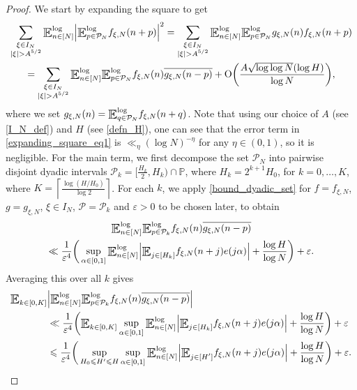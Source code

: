 \documentclass[letter,11pt]{article}
\theoremstyle{plain} %
\theoremstyle{definition} %
\theoremstyle{plain}
\theoremstyle{plain}
\theoremstyle{plain}
\numberwithin{equation}{section}
\newcommand{\Oh}{{\mathrm O}}
\renewcommand{\epsilon}{\varepsilon}
\renewcommand{\leq}{\leqslant}
\renewcommand{\P}{\mathbb{P}}
\newcommand{\E}{\raisebox{-0.4ex}{\scalebox{1.4}[1.3]{$\mathbb{E}$}}}
\newcommand{\Esub}[1]{\raisebox{-0.4ex}{\scalebox{1.4}[1.3]{$\mathbb{E}$}}\raisebox{-0.35ex}{\ensuremath{_{\scriptstyle #1}}}}
\newcommand{\logE}{{\E}^{\log}}
\newcommand{\1}{\mathbbm{1}}
\newcommand{\f}{f_{\xi,N}}
\newcommand{\Pc}{\mathcal{P}}
\begin{document}
\begin{proof}
We start by expanding the square to get
\begin{multline}\label{expanding_square_eq1}
    \sum_{\substack{\xi\in I_N \\ |\xi|>A^{5/2}}}
    \logE_{n\in[N]}\Big|\logE_{p\in\Pc_N}\f(n+p)\Big|^2 
    = \sum_{\substack{\xi\in I_N \\ |\xi|>A^{5/2}}}
    \logE_{n\in[N]}\logE_{p\in\Pc_N}g_{\xi,N}(n)\f(n+p)  \\
    = \sum_{\substack{\xi\in I_N \\ |\xi|>A^{5/2}}}
    \logE_{n\in[N]}\logE_{p\in\Pc_N}\f(n)
    \overline{g_{\xi,N}(n-p)}
    + \Oh\bigg(\frac{A\sqrt{\log\log{N}}(\log{H})}{\log{N}}\bigg), 
\end{multline}
where we set $g_{\xi,N}(n) = \logE_{q\in\Pc_N}\f(n+q)$.
Note that using our choice of $A$ (see \eqref{I_N_def}) and $H$ (see \eqref{defn_H}), one can see that the error term in \eqref{expanding_square_eq1} is $\ll_\eta (\log{N})^{-\eta}$ for any $\eta\in(0,1)$, so it is negligible.
For the main term, we first decompose the set $\Pc_N$ into pairwise disjoint dyadic intervals $\Pc_k=[\frac{H_k}{2},H_k)\cap\P$, where $H_k = 2^{k+1}H_0$, for $k=0,\ldots,K$, where $K=\left\lceil\frac{\log(H/H_0)}{\log{2}}\right\rceil$.
For each $k$, we apply \cref{bound_dyadic_set} for $f=\f$, $g=g_{\xi,N}$, $\xi\in I_N$, $\Pc=\Pc_k$ and $\epsilon>0$ to be chosen later, to obtain
\begin{multline*}
    \logE_{n\in[N]}\logE_{p\in\Pc_k} \f(n)\overline{g_{\xi,N}(n-p)} \\
    \ll \frac{1}{\epsilon^4}\bigg(\sup_{\alpha\in[0,1]}\logE_{n\in[N]}\Big|\Esub{j\in[H_k]}\f(n+j)e(j\alpha)\Big| + \frac{\log{H}}{\log{N}}\bigg) + \epsilon.
\end{multline*}
Averaging this over all $k$ gives
\begin{align}\label{averaging_over_k}
    \Esub{k\in[0,K]} &
    \Big|\logE_{n\in[N]} \logE_{p\in\Pc_k} \f(n)\overline{g_{\xi,N}(n-p)}\Big| \notag \\
    & \ll \frac{1}{\epsilon^4}\bigg(\Esub{k\in[0,K]}\sup_{\alpha\in[0,1]}\logE_{n\in[N]}\Big|\Esub{j\in[H_k]}\f(n+j)e(j\alpha)\Big| + \frac{\log{H}}{\log{N}}\bigg) + \epsilon \notag \\
    & \leq \frac{1}{\epsilon^4}\bigg(\sup_{H_0\leq H'\leq H}\sup_{\alpha\in[0,1]}\logE_{n\in[N]}\Big|\Esub{j\in[H']}\f(n+j)e(j\alpha)\Big| + \frac{\log{H}}{\log{N}}\bigg) + \epsilon.
\end{align}


\end{proof}
\end{document}
